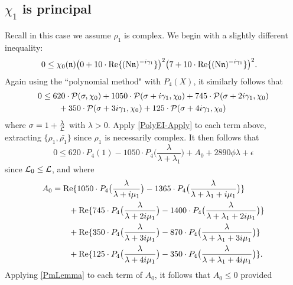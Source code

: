 \documentclass[12pt,psamsfonts]{amsart}
\theoremstyle{definition}
\theoremstyle{remark}
\numberwithin{equation}{section}
\begin{document}
\subsection*{$\chi_1$ is principal} Recall in this case we assume $\rho_1$ is complex.  We begin with a slightly different inequality:
\begin{align*}
0 & \leq \chi_0(\mathfrak{n}) \big(0+10 \cdot\mathrm{Re}\{  (\mathrm{N}\mathfrak{n})^{-i\gamma_1}\} \big)^2 \big( 7 + 10 \cdot \mathrm{Re}\{ (\mathrm{N}\mathfrak{n})^{-i\gamma_1} \} \big)^2.
\end{align*}
Again using the ``polynomial method" with $P_4(X)$, it similarly follows that
\begin{equation}
\begin{aligned}
0 & \leq 620 \cdot \mathcal{P}(\sigma, \chi_0)  +  1050  \cdot \mathcal{P}(\sigma+i\gamma_1, \chi_0) +  745 \cdot \mathcal{P}(\sigma+2i\gamma_1, \chi_0) \\
& \qquad +  350 \cdot \mathcal{P}(\sigma + 3i\gamma_1, \chi_0) + 125 \cdot \mathcal{P}(\sigma + 4i\gamma_1, \chi_0) \\
\end{aligned} 
\label{TrigIdentity-ZFR-Poly-P}
\end{equation}
where $\sigma = 1 + \tfrac{\lambda}{\mathcal{L}}$ with $\lambda > 0$. Apply \cref{PolyEI-Apply} to each term above, extracting $\{ \rho_1, \bar{\rho_1}\}$ since $\rho_1$ is necessarily complex.   It then follows that
\begin{equation} 
0 \leq 620 \cdot P_4(1)  - 1050 \cdot P_4\big( \frac{\lambda}{\lambda+\lambda_1} \big) + A_0 + 2890\phi \lambda+ \epsilon
\label{ZFR-Poly-Identity-P}
\end{equation}
since $\mathcal{L}_0 \leq \mathcal{L}$, and where
\begin{align*}
A_0 & =   \ds \Re\{ 1050 \cdot  P_4\big( \frac{\lambda}{\lambda+i\mu_1} \big)  - 1365 \cdot P_4\big( \frac{\lambda}{\lambda+\lambda_1 + i\mu_1} \big)  \} \\
 \vspace*{2mm}
&  \ds \qquad + \Re\{ 745 \cdot P_4\big( \frac{\lambda}{\lambda+2i\mu_1} \big)   - 1400 \cdot P_4\big( \frac{\lambda}{\lambda+\lambda_1 + 2i\mu_1} \big)  \} \\
&  \ds \qquad + \Re\{ 350 \cdot P_4\big( \frac{\lambda}{\lambda+3i\mu_1} \big)   - 870 \cdot P_4\big( \frac{\lambda}{\lambda+\lambda_1 + 3i\mu_1} \big)  \}  \\
&  \ds \qquad + \Re\{ 125 \cdot P_4\big( \frac{\lambda}{\lambda+4i\mu_1} \big)  - 350 \cdot P_4\big( \frac{\lambda}{\lambda+\lambda_1 + 4i\mu_1} \big)  \}.
\end{align*}
Applying \cref{PmLemma} to each term of $A_0$, it follows that $A_0 \leq 0$ provided
\end{document}
